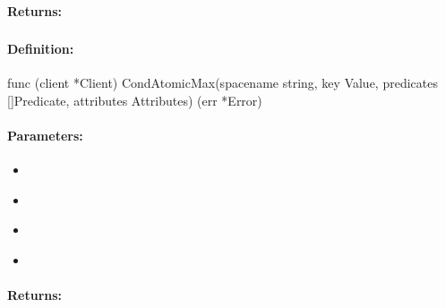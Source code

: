 \paragraph{Returns:}


\pagebreak
\subsubsection{}
\label{api:Go:CondAtomicMax}


\paragraph{Definition:}
\begin{gocode}
func (client *Client) CondAtomicMax(spacename string, key Value, predicates []Predicate, attributes Attributes) (err *Error)
\end{gocode}

\paragraph{Parameters:}
\begin{itemize}[noitemsep]
\item {}\\

\item {}\\

\item {}\\

\item {}\\

\end{itemize}

\paragraph{Returns:}


\pagebreak
\subsubsection{}
\label{api:Go:GroupAtomicMax}


